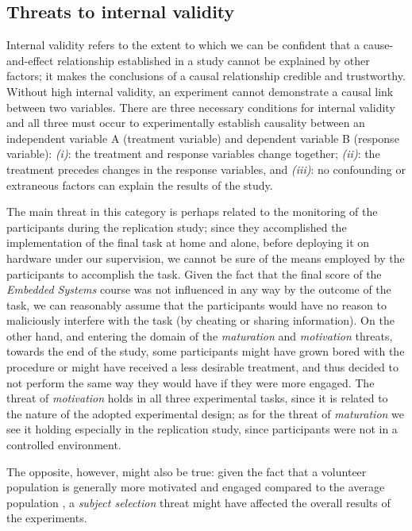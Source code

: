 \subsection{Threats to internal validity}
Internal validity refers to the extent to which we can be confident that a cause-and-effect relationship established in a study cannot be explained by other factors; it makes the conclusions of a causal relationship credible and trustworthy. Without high internal validity, an experiment cannot demonstrate a causal link between two variables.
There are three necessary conditions for internal validity and all three must occur to experimentally establish causality between an independent variable A (treatment variable) and dependent variable B (response variable): \textit{(i)}: the treatment and response variables change together; \textit{(ii)}: the treatment precedes changes in the response variables, and \textit{(iii)}: no confounding or extraneous factors can explain the results of the study.

The main threat in this category is perhaps related to the monitoring of the participants during the replication study; since they accomplished the implementation of the final task at home and alone, before deploying it on hardware under our supervision, we cannot be sure of the means employed by the participants to accomplish the task. Given the fact that the final score of the \textit{Embedded Systems} course was not influenced in any way by the outcome of the task, we can reasonably assume that the participants would have no reason to maliciously interfere with the task (\ie by cheating or sharing information). On the other hand, and entering the domain of the \textit{maturation} and \textit{motivation} threats, towards the end of the study, some participants might have grown bored with the procedure or might have received a less desirable treatment, and thus decided to not perform the same way they would have if they were more engaged. The threat of \textit{motivation} holds in all three experimental tasks, since it is related to the nature of the adopted experimental design; as for the threat of \textit{maturation} we see it holding especially in the replication study, since participants were not in a controlled environment.

The opposite, however, might also be true: given the fact that a volunteer population is generally more motivated and engaged compared to the average population \cite{DBLP:books/sp/WohlinRHOR00}, a \textit{subject selection} threat might have affected the overall results of the experiments.


